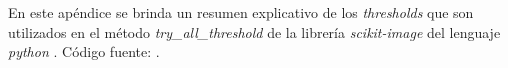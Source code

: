 \singlespacing
{}
\label{chap:apendthresh}

\pagestyle{plain}

En este apéndice se brinda un resumen explicativo de los \textit{thresholds} que son utilizados en el método \textit{try\_all\_threshold} de la librería \textit{scikit-image} del lenguaje \textit{python} \cite{van2014scikit}.
Código fuente: \href{https://github.com/scikit-image/scikit-image/blob/master/skimage/filters/thresholding.py}{\faGithub}.

